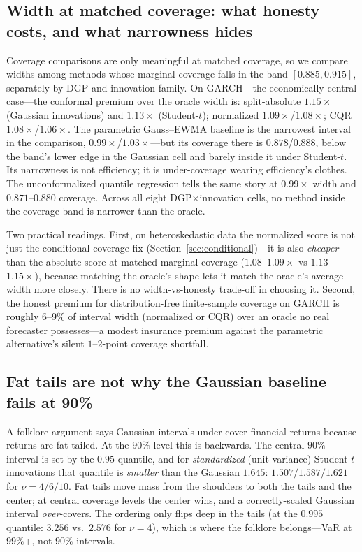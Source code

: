 \documentclass[11pt]{article}
\begin{document}
\subsection{Width at matched coverage: what honesty costs, and what narrowness hides}
\label{sec:width}

Coverage comparisons are only meaningful at matched coverage, so we compare
widths among methods whose marginal coverage falls in the band
$[0.885,0.915]$, separately by DGP and innovation family. On GARCH---the
economically central case---the conformal premium over the oracle width is:
split-absolute $1.15\times$ (Gaussian innovations) and $1.13\times$
(Student-$t$); normalized $1.09\times$/$1.08\times$; CQR
$1.08\times$/$1.06\times$. The parametric Gauss--EWMA baseline is the
narrowest interval in the comparison, $0.99\times$/$1.03\times$---but its
coverage there is $0.878$/$0.888$, below the band's lower edge in the Gaussian
cell and barely inside it under Student-$t$. Its narrowness is not
efficiency; it is under-coverage wearing efficiency's clothes. The
unconformalized quantile regression tells the same story at $0.99\times$ width
and $0.871$--$0.880$ coverage. Across all eight DGP$\times$innovation cells,
no method inside the coverage band is narrower than the oracle.

Two practical readings. First, on heteroskedastic data the normalized score
is not just the conditional-coverage fix (Section~\ref{sec:conditional})---it
is also \emph{cheaper} than the absolute score at matched marginal coverage
($1.08$--$1.09\times$ vs $1.13$--$1.15\times$), because matching the oracle's
shape lets it match the oracle's average width more closely. There is no
width-vs-honesty trade-off in choosing it. Second, the honest premium for
distribution-free finite-sample coverage on GARCH is roughly $6$--$9\%$ of
interval width (normalized or CQR) over an oracle no real forecaster
possesses---a modest insurance premium against the parametric alternative's
silent $1$--$2$-point coverage shortfall.

\subsection{Fat tails are not why the Gaussian baseline fails at 90\%}
\label{sec:tails}

A folklore argument says Gaussian intervals under-cover financial returns
because returns are fat-tailed. At the $90\%$ level this is backwards. The
central $90\%$ interval is set by the $0.95$ quantile, and for
\emph{standardized} (unit-variance) Student-$t$ innovations that quantile is
\emph{smaller} than the Gaussian $1.645$: $1.507/1.587/1.621$ for
$\nu=4/6/10$. Fat tails move mass from the shoulders to both the tails and
the center; at central coverage levels the center wins, and a correctly-scaled
Gaussian interval \emph{over}-covers. The ordering only flips deep in the
tails (at the $0.995$ quantile: $3.256$ vs.\ $2.576$ for $\nu=4$), which is
where the folklore belongs---VaR at $99\%$+, not $90\%$ intervals.
\end{document}
